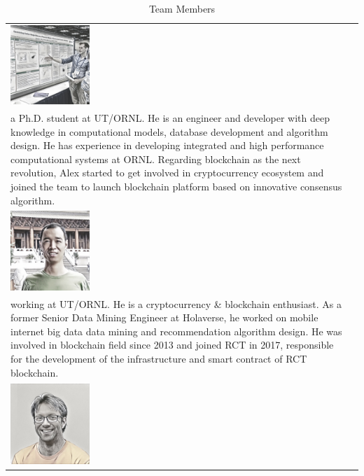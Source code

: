 \documentclass[a4paper,oneside,openany]{tufte-book}
\begin{document}
\begin{table}[ht]
\centering
\caption{Team Members}
\label{tab_teamMembers}
\begin{tabular}{ l | l }
     \includegraphics[width=30mm]{fig/p2} & \begin{minipage}{40em}
  \emph{Alexander Cope} \\ a Ph.D. student at UT/ORNL. He is an engineer and developer with deep knowledge in computational models, database development and algorithm design. He has experience in developing integrated and high performance computational systems at ORNL. Regarding blockchain as the next revolution, Alex started to get involved in cryptocurrency ecosystem and joined the team to launch blockchain platform based on innovative consensus algorithm.
\end{minipage}\\
     \includegraphics[width=30mm]{fig/p4} &\begin{minipage}{40em}
  \emph{Jason Lian} \\ working at UT/ORNL. He is a cryptocurrency \& blockchain enthusiast. As a former Senior Data Mining Engineer at Holaverse, he worked on mobile internet big data data mining and recommendation algorithm design. He was involved in blockchain field since 2013 and joined RCT in 2017, responsible for the development of the infrastructure and smart contract of RCT blockchain.
\end{minipage} \\
      \includegraphics[width=30mm]{fig/p3}     &\begin{minipage}{40em}

\end{minipage}
\end{tabular}
\end{table}
\end{document}

